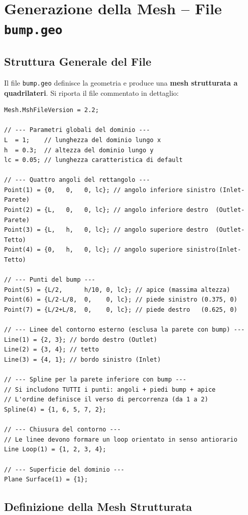 \section{Generazione della Mesh -- File \texttt{bump.geo}}
\label{sec:bump_geo}

\subsection{Struttura Generale del File}

Il file \texttt{bump.geo} definisce la geometria e produce una \textbf{mesh strutturata a
quadrilateri}. Si riporta il file commentato in dettaglio:

\begin{lstlisting}[style=gmsh, caption={File \texttt{bump.geo} -- geometria e mesh strutturata.}, label={lst:bump_geo}]
Mesh.MshFileVersion = 2.2;

// --- Parametri globali del dominio ---
L  = 1;    // lunghezza del dominio lungo x
h  = 0.3;  // altezza del dominio lungo y
lc = 0.05; // lunghezza caratteristica di default

// --- Quattro angoli del rettangolo ---
Point(1) = {0,   0,   0, lc}; // angolo inferiore sinistro (Inlet-Parete)
Point(2) = {L,   0,   0, lc}; // angolo inferiore destro  (Outlet-Parete)
Point(3) = {L,   h,   0, lc}; // angolo superiore destro  (Outlet-Tetto)
Point(4) = {0,   h,   0, lc}; // angolo superiore sinistro(Inlet-Tetto)

// --- Punti del bump ---
Point(5) = {L/2,      h/10, 0, lc}; // apice (massima altezza)
Point(6) = {L/2-L/8,  0,    0, lc}; // piede sinistro (0.375, 0)
Point(7) = {L/2+L/8,  0,    0, lc}; // piede destro   (0.625, 0)

// --- Linee del contorno esterno (esclusa la parete con bump) ---
Line(1) = {2, 3}; // bordo destro (Outlet)
Line(2) = {3, 4}; // tetto
Line(3) = {4, 1}; // bordo sinistro (Inlet)

// --- Spline per la parete inferiore con bump ---
// Si includono TUTTI i punti: angoli + piedi bump + apice
// L'ordine definisce il verso di percorrenza (da 1 a 2)
Spline(4) = {1, 6, 5, 7, 2};

// --- Chiusura del contorno ---
// Le linee devono formare un loop orientato in senso antiorario
Line Loop(1) = {1, 2, 3, 4};

// --- Superficie del dominio ---
Plane Surface(1) = {1};
\end{lstlisting}

\subsection{Definizione della Mesh Strutturata}
\label{sec:bump_transfinite}

